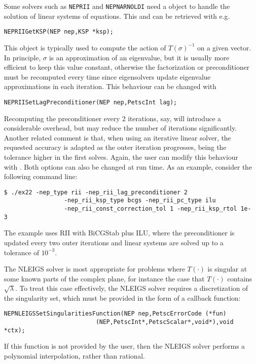 Some solvers such as \texttt{NEPRII} and \texttt{NEPNARNOLDI} need a  object to handle the solution of linear systems of equations. This  and can be retrieved with e.g.
	\begin{Verbatim}[fontsize=\small]
	NEPRIIGetKSP(NEP nep,KSP *ksp);
	\end{Verbatim}

This  object is typically used to compute the action of $T(\sigma)^{-1}$ on a given vector. In principle, $\sigma$ is an approximation of an eigenvalue, but it is usually more efficient to keep this value constant, otherwise the factorization or preconditioner must be recomputed every time since eigensolvers update eigenvalue approximations in each iteration. This behaviour can be changed with
	\begin{Verbatim}[fontsize=\small]
	NEPRIISetLagPreconditioner(NEP nep,PetscInt lag);
	\end{Verbatim}
Recomputing the preconditioner every 2 iterations, say, will introduce a considerable overhead, but may reduce the number of iterations significantly. Another related comment is that, when using an iterative linear solver, the requested accuracy is adapted as the outer iteration progresses, being the tolerance higher in the first solves. Again, the user can modify this behaviour with . Both options can also be changed at run time. As an example, consider the following command line:
\begin{Verbatim}[fontsize=\small]
	$ ./ex22 -nep_type rii -nep_rii_lag_preconditioner 2
                 -nep_rii_ksp_type bcgs -nep_rii_pc_type ilu
                 -nep_rii_const_correction_tol 1 -nep_rii_ksp_rtol 1e-3
\end{Verbatim}
The example uses RII with BiCGStab plus ILU, where the preconditioner is updated every two outer iterations and linear systems are solved up to a tolerance of $10^{-3}$.

The NLEIGS solver is most appropriate for problems where $T(\cdot)$ is singular at some known parts of the complex plane, for instance the case that $T(\cdot)$ contains $\sqrt{\lambda}$. To treat this case effectively, the NLEIGS solver requires a discretization of the singularity set, which must be provided in the form of a callback function:
	\begin{Verbatim}[fontsize=\small]
        NEPNLEIGSSetSingularitiesFunction(NEP nep,PetscErrorCode (*fun)
                          (NEP,PetscInt*,PetscScalar*,void*),void *ctx);
	\end{Verbatim}
If this function is not provided by the user, then the NLEIGS solver performs a polynomial interpolation, rather than rational.

